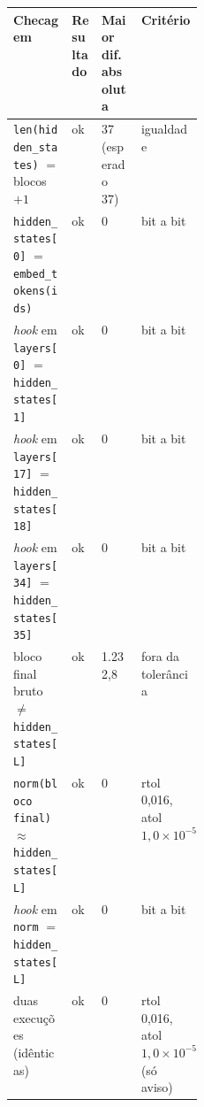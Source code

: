 \footnotesize
\begin{tabularx}{\linewidth}{>{\raggedright\arraybackslash}X l l >{\raggedright\arraybackslash}p{0.25\linewidth}}
\toprule
Checagem & Resultado & Maior dif. absoluta & Critério \\
\midrule
\texttt{len(hidden\_states)} $=$ blocos $+1$ & ok & 37 (esperado 37) & igualdade \\
\texttt{hidden\_states[0]} $=$ \texttt{embed\_tokens(ids)} & ok & 0 & bit a bit \\
\textit{hook} em \texttt{layers[0]} $=$ \texttt{hidden\_states[1]} & ok & 0 & bit a bit \\
\textit{hook} em \texttt{layers[17]} $=$ \texttt{hidden\_states[18]} & ok & 0 & bit a bit \\
\textit{hook} em \texttt{layers[34]} $=$ \texttt{hidden\_states[35]} & ok & 0 & bit a bit \\
bloco final bruto $\neq$ \texttt{hidden\_states[L]} & ok & 1.232,8 & fora da tolerância \\
\texttt{norm(bloco final)} $\approx$ \texttt{hidden\_states[L]} & ok & 0 & rtol 0,016, atol $1{,}0\times10^{-5}$ \\
\textit{hook} em \texttt{norm} $=$ \texttt{hidden\_states[L]} & ok & 0 & bit a bit \\
duas execuções (idênticas) & ok & 0 & rtol 0,016, atol $1{,}0\times10^{-5}$ (só aviso) \\
\bottomrule
\end{tabularx}

\par{}
